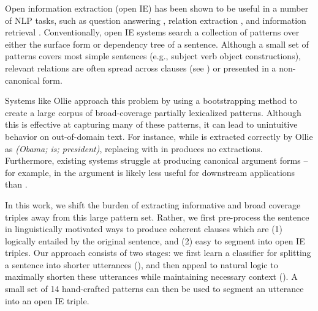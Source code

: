 Open information extraction (open IE) has been shown to be useful in a
  number of NLP tasks, such as question answering \cite{key:2014fader-openqa},
  relation extraction \cite{key:2010soderland-adapting}, 
  and information retrieval \cite{key:2011etzioni-nature}.
Conventionally, open IE systems search a collection of patterns over either
  the surface form or dependency tree of a sentence.
Although a small set of patterns covers most simple sentences 
  (e.g., subject verb object constructions),
  relevant relations are often spread across clauses (see
  ) or presented in a non-canonical form.

Systems like Ollie \cite{key:2012mausam-ollie} approach this problem by 
  using a bootstrapping method to create a large corpus of broad-coverage
  partially lexicalized patterns.
Although this is effective at capturing many of these patterns,
  it can lead to unintuitive behavior on out-of-domain text.
For instance, while  is extracted correctly by Ollie
  as \textit{(Obama; is; president)}, replacing  with  in 
   produces no extractions.
Furthermore, existing systems struggle at producing
  canonical argument forms -- for example, in  the argument
   is likely less useful for downstream
  applications than .

In this work, we shift the burden of extracting informative and broad
  coverage triples away from this large pattern set.
Rather, we first pre-process the sentence in linguistically motivated ways
  to produce coherent clauses which are (1) logically entailed by the 
  original sentence, and (2) easy to segment into open IE triples.
Our approach consists of two stages:
  we first learn a classifier for splitting a sentence into shorter
  utterances (), 
  and then appeal to natural logic \cite{key:1991valencia-natlog}
  to maximally
  shorten these utterances while maintaining necessary context ().
A small set of 14 hand-crafted patterns can then be used to segment an
  utterance into an open IE triple.

